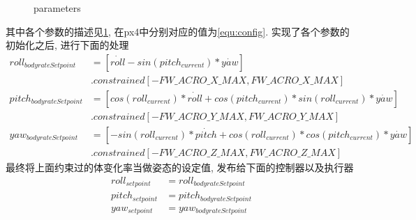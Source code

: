 \begin{figure}[htbp]
  \centering
  \caption{parameters}
  \label{fig:param}
\end{figure}
其中各个参数的描述见\ref{fig:param}, 在px4中分别对应的值为\ref{equ:config}. 实现了各个参数的初始化之后, 进行下面的处理
\begin{equation}
  \begin{split}
  roll_{bodyrateSetpoint} &= [\dot{roll} - sin(pitch_{current}) * \dot{yaw}]\\
                          &.constrained[-FW\_ACRO\_X\_MAX, FW\_ACRO\_X\_MAX] \\    
  pitch_{bodyrateSetpoint} &= [cos(roll_{current})*\dot{roll} + cos(pitch_{current}) * sin(roll_{current}) * \dot{yaw}]\\
                          &.constrained[-FW\_ACRO\_Y\_MAX, FW\_ACRO\_Y\_MAX]\\
  yaw_{bodyrateSetpoint} &= [-sin(roll_{current}) * \dot{pitch} + cos(roll_{current}) * cos(pitch_{current}) * \dot{yaw}] \\
                          &.constrained[-FW\_ACRO\_Z\_MAX, FW\_ACRO\_Z\_MAX]
  \end{split}
\end{equation}
最终将上面约束过的体变化率当做姿态的设定值, 发布给下面的控制器以及执行器
\begin{equation}
  \begin{split}
    roll_{setpoint} &= roll_{bodyrateSetpoint} \\
    pitch_{setpoint} &= pitch_{bodyrateSetpoint} \\
    yaw_{setpoint} &= yaw_{bodyrateSetpoint}  
  \end{split}
\end{equation}
